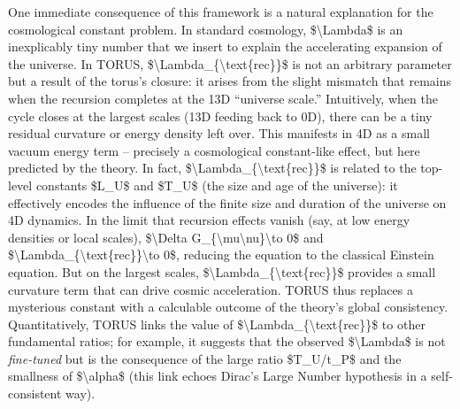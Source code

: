\documentclass[
]{article}
\begin{document}
One immediate consequence of this framework is a natural explanation for
the cosmological constant problem. In standard cosmology,
\$\textbackslash Lambda\$ is an inexplicably tiny number that we insert
to explain the accelerating expansion of the universe. In TORUS,
\$\textbackslash Lambda\_\{\textbackslash text\{rec\}\}\$ is not an
arbitrary parameter but a result of the torus's closure: it arises from
the slight mismatch that remains when the recursion completes at the 13D
``universe scale.'' Intuitively, when the cycle closes at the largest
scales (13D feeding back to 0D), there can be a tiny residual curvature
or energy density left over. This manifests in 4D as a small vacuum
energy term -- precisely a cosmological constant-like effect, but here
predicted by the theory. In fact,
\$\textbackslash Lambda\_\{\textbackslash text\{rec\}\}\$ is related to
the top-level constants \$L\_U\$ and \$T\_U\$ (the size and age of the
universe): it effectively encodes the influence of the finite size and
duration of the universe on 4D dynamics. In the limit that recursion
effects vanish (say, at low energy densities or local scales),
\$\textbackslash Delta
G\_\{\textbackslash mu\textbackslash nu\}\textbackslash to 0\$ and
\$\textbackslash Lambda\_\{\textbackslash text\{rec\}\}\textbackslash to
0\$, reducing the equation to the classical Einstein equation. But on
the largest scales,
\$\textbackslash Lambda\_\{\textbackslash text\{rec\}\}\$ provides a
small curvature term that can drive cosmic acceleration. TORUS thus
replaces a mysterious constant with a calculable outcome of the theory's
global consistency. Quantitatively, TORUS links the value of
\$\textbackslash Lambda\_\{\textbackslash text\{rec\}\}\$ to other
fundamental ratios; for example, it suggests that the observed
\$\textbackslash Lambda\$ is not \emph{fine-tuned} but is the
consequence of the large ratio \$T\_U/t\_P\$ and the smallness of
\$\textbackslash alpha\$ (this link echoes Dirac's Large Number
hypothesis in a self-consistent way).
\end{document}
